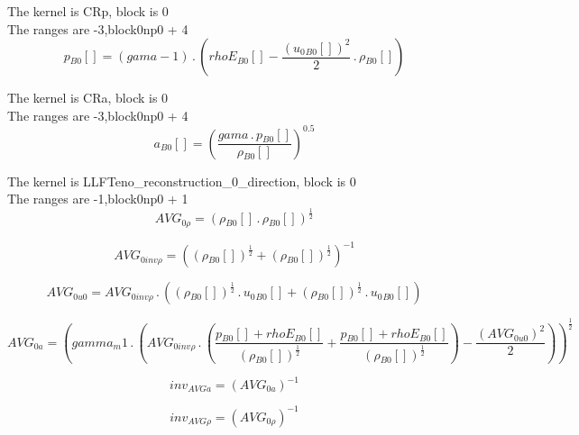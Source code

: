 \documentclass{article}
\begin{document}
\noindent The kernel is CRp, block is 0\\\noindent The ranges are -3,block0np0 + 4\\\begin{dmath}{p{_{B0}}}[{}] = \left(gama - 1\right) \,.\, \left({rhoE{_{B0}}}[{}] - \frac{\left({u_{0}{_{B0}}}[{}] \right)^{2}}{2} \,.\, {\rho{_{B0}}}[{}]\right)\end{dmath}

\noindent The kernel is CRa, block is 0\\\noindent The ranges are -3,block0np0 + 4\\\begin{dmath}{a{_{B0}}}[{}] = \left(\frac{gama \,.\, {p{_{B0}}}[{}]}{{\rho{_{B0}}}[{}]} \right)^{0.5}\end{dmath}

\noindent The kernel is LLFTeno_reconstruction_0_direction, block is 0\\\noindent The ranges are -1,block0np0 + 1\\\begin{dmath}AVG_{0 \rho} = \left({\rho{_{B0}}}[{}] \,.\, {\rho{_{B0}}}[{}] \right)^{\frac{1}{2}}\end{dmath}

\begin{dmath}AVG_{0 inv \rho} = \left(\left({\rho{_{B0}}}[{}] \right)^{\frac{1}{2}} + \left({\rho{_{B0}}}[{}] \right)^{\frac{1}{2}} \right)^{-1}\end{dmath}

\begin{dmath}AVG_{0 u0} = AVG_{0 inv \rho} \,.\, \left(\left({\rho{_{B0}}}[{}] \right)^{\frac{1}{2}} \,.\, {u_{0}{_{B0}}}[{}] + \left({\rho{_{B0}}}[{}] \right)^{\frac{1}{2}} \,.\, {u_{0}{_{B0}}}[{}]\right)\end{dmath}

\begin{dmath}AVG_{0 a} = \left(gamma_m1 \,.\, \left(AVG_{0 inv \rho} \,.\, \left(\frac{{p{_{B0}}}[{}] + {rhoE{_{B0}}}[{}]}{\left({\rho{_{B0}}}[{}] \right)^{\frac{1}{2}}} + \frac{{p{_{B0}}}[{}] + {rhoE{_{B0}}}[{}]}{\left({\rho{_{B0}}}[{}] 
\right)^{\frac{1}{2}}}\right) - \frac{\left(AVG_{0 u0} \right)^{2}}{2}\right) \right)^{\frac{1}{2}}\end{dmath}

\begin{dmath}inv_{AVG a} = \left(AVG_{0 a} \right)^{-1}\end{dmath}

\begin{dmath}inv_{AVG \rho} = \left(AVG_{0 \rho} \right)^{-1}\end{dmath}
\end{document}

